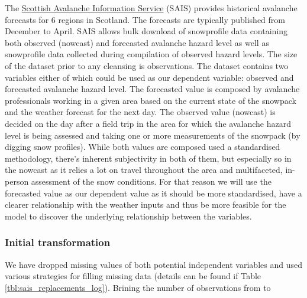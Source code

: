 \documentclass{article}
\begin{document}
	The \href{https://www.sais.gov.uk/forecast-archive/}{Scottish Avalanche Information Service} (SAIS) provides historical avalanche forecasts for 6 regions in Scotland. The forecasts are typically published from December to April. SAIS allows bulk download of snowprofile data containing both observed (nowcast) and forecasted avalanche hazard level as well as snowprofile data collected during compilation of observed hazard levels. The size of the dataset prior to any cleansing is observations.
	\newline
	The dataset contains two variables either of which could be used as our dependent variable: observed and forecasted avalanche hazard level.
	The forecasted value is composed by avalanche professionals working in a given area based on the current state of the snowpack and the weather forecast for the next day.
	The observed value (nowcast) is decided on the day after a field trip in the area for which the avalanche hazard level is being assessed and taking one or more measurements of the snowpack (by digging snow profiles).
	\newline
	While both values are composed used a standardised methodology, there's inherent subjectivity in both of them, but especially so in the nowcast as it relies a lot on travel throughout the area and multifaceted, in-person assessment of the snow conditions. For that reason we will use the forecasted value as our dependent value as it should be more standardised, have a clearer relationship with the weather inputs and thus be more feasible for the model to discover the underlying relationship between the variables.

\subsubsection{Initial transformation}
	We have dropped missing values of both potential independent variables and used various strategies for filling missing data (details can be found if Table \ref{tbl:sais_replacements_log}). Brining the number of observations from  to 
\end{document}
